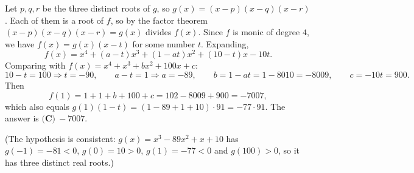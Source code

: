 Let $p,q,r$ be the three distinct roots of $g$, so $g(x)=(x-p)(x-q)(x-r)$. Each of them is a root of $f$, so by the factor theorem $(x-p)(x-q)(x-r)=g(x)$ divides $f(x)$. Since $f$ is monic of degree $4$, we have $f(x)=g(x)(x-t)$ for some number $t$. Expanding,
\[f(x)=x^4+(a-t)x^3+(1-at)x^2+(10-t)x-10t .\]
Comparing with $f(x)=x^4+x^3+bx^2+100x+c$:
\[10-t=100\Rightarrow t=-90,\qquad a-t=1\Rightarrow a=-89,\qquad b=1-at=1-8010=-8009,\qquad c=-10t=900 .\]
Then
\[f(1)=1+1+b+100+c=102-8009+900=-7007,\]
which also equals $g(1)(1-t)=(1-89+1+10)\cdot91=-77\cdot91$. The answer is $\boxed{\textbf{(C)}\ -7007}$.

(The hypothesis is consistent: $g(x)=x^3-89x^2+x+10$ has $g(-1)=-81<0$, $g(0)=10>0$, $g(1)=-77<0$ and $g(100)>0$, so it has three distinct real roots.)
